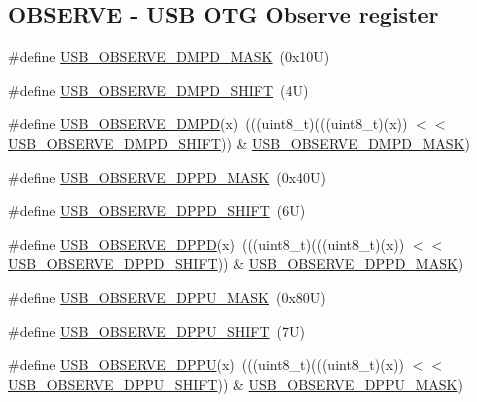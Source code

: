 \subsection*{O\+B\+S\+E\+R\+VE -\/ U\+SB O\+TG Observe register}
\begin{DoxyCompactItemize}
\item 
\#define \mbox{\hyperlink{group___u_s_b___register___masks_ga796850497f75cc88772d3826d1196a43}{U\+S\+B\+\_\+\+O\+B\+S\+E\+R\+V\+E\+\_\+\+D\+M\+P\+D\+\_\+\+M\+A\+SK}}~(0x10\+U)
\item 
\#define \mbox{\hyperlink{group___u_s_b___register___masks_ga044fcfc292ba6db33ec4e847a6510440}{U\+S\+B\+\_\+\+O\+B\+S\+E\+R\+V\+E\+\_\+\+D\+M\+P\+D\+\_\+\+S\+H\+I\+FT}}~(4\+U)
\item 
\#define \mbox{\hyperlink{group___u_s_b___register___masks_gaa9e05cb77f4ac1c1dd88ba27574df3dc}{U\+S\+B\+\_\+\+O\+B\+S\+E\+R\+V\+E\+\_\+\+D\+M\+PD}}(x)~(((uint8\+\_\+t)(((uint8\+\_\+t)(x)) $<$$<$ \mbox{\hyperlink{group___u_s_b___register___masks_ga044fcfc292ba6db33ec4e847a6510440}{U\+S\+B\+\_\+\+O\+B\+S\+E\+R\+V\+E\+\_\+\+D\+M\+P\+D\+\_\+\+S\+H\+I\+FT}})) \& \mbox{\hyperlink{group___u_s_b___register___masks_ga796850497f75cc88772d3826d1196a43}{U\+S\+B\+\_\+\+O\+B\+S\+E\+R\+V\+E\+\_\+\+D\+M\+P\+D\+\_\+\+M\+A\+SK}})
\item 
\#define \mbox{\hyperlink{group___u_s_b___register___masks_ga8368ad607c0f5a0ab499734e26f36aad}{U\+S\+B\+\_\+\+O\+B\+S\+E\+R\+V\+E\+\_\+\+D\+P\+P\+D\+\_\+\+M\+A\+SK}}~(0x40\+U)
\item 
\#define \mbox{\hyperlink{group___u_s_b___register___masks_gaba84f8caae5d942588bd678bbc2ad267}{U\+S\+B\+\_\+\+O\+B\+S\+E\+R\+V\+E\+\_\+\+D\+P\+P\+D\+\_\+\+S\+H\+I\+FT}}~(6\+U)
\item 
\#define \mbox{\hyperlink{group___u_s_b___register___masks_gab317284d7d9fc6132a9cd00293c69015}{U\+S\+B\+\_\+\+O\+B\+S\+E\+R\+V\+E\+\_\+\+D\+P\+PD}}(x)~(((uint8\+\_\+t)(((uint8\+\_\+t)(x)) $<$$<$ \mbox{\hyperlink{group___u_s_b___register___masks_gaba84f8caae5d942588bd678bbc2ad267}{U\+S\+B\+\_\+\+O\+B\+S\+E\+R\+V\+E\+\_\+\+D\+P\+P\+D\+\_\+\+S\+H\+I\+FT}})) \& \mbox{\hyperlink{group___u_s_b___register___masks_ga8368ad607c0f5a0ab499734e26f36aad}{U\+S\+B\+\_\+\+O\+B\+S\+E\+R\+V\+E\+\_\+\+D\+P\+P\+D\+\_\+\+M\+A\+SK}})
\item 
\#define \mbox{\hyperlink{group___u_s_b___register___masks_ga04f8b1d77478cb027a79323cef482965}{U\+S\+B\+\_\+\+O\+B\+S\+E\+R\+V\+E\+\_\+\+D\+P\+P\+U\+\_\+\+M\+A\+SK}}~(0x80\+U)
\item 
\#define \mbox{\hyperlink{group___u_s_b___register___masks_ga08ff5b00473fda9eb458f3457490eb15}{U\+S\+B\+\_\+\+O\+B\+S\+E\+R\+V\+E\+\_\+\+D\+P\+P\+U\+\_\+\+S\+H\+I\+FT}}~(7\+U)
\item 
\#define \mbox{\hyperlink{group___u_s_b___register___masks_gac95d445b08a1a0abb32095b3b6213f14}{U\+S\+B\+\_\+\+O\+B\+S\+E\+R\+V\+E\+\_\+\+D\+P\+PU}}(x)~(((uint8\+\_\+t)(((uint8\+\_\+t)(x)) $<$$<$ \mbox{\hyperlink{group___u_s_b___register___masks_ga08ff5b00473fda9eb458f3457490eb15}{U\+S\+B\+\_\+\+O\+B\+S\+E\+R\+V\+E\+\_\+\+D\+P\+P\+U\+\_\+\+S\+H\+I\+FT}})) \& \mbox{\hyperlink{group___u_s_b___register___masks_ga04f8b1d77478cb027a79323cef482965}{U\+S\+B\+\_\+\+O\+B\+S\+E\+R\+V\+E\+\_\+\+D\+P\+P\+U\+\_\+\+M\+A\+SK}})
\end{DoxyCompactItemize}
